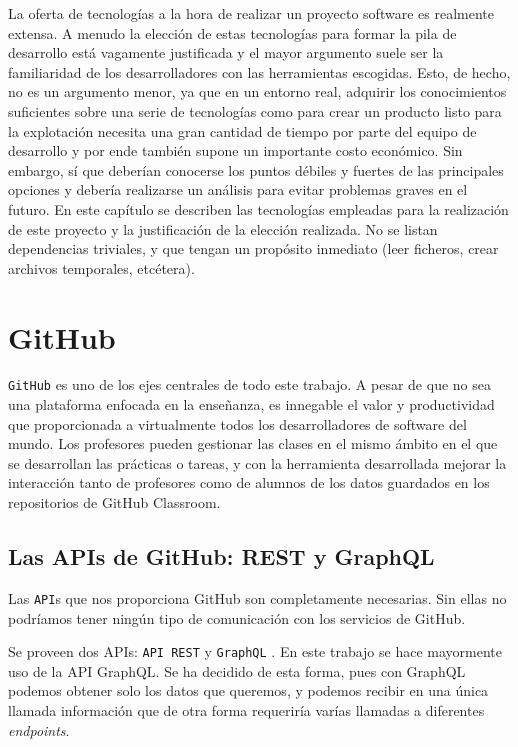 La oferta de tecnologías a la hora de realizar un proyecto software es realmente extensa. A menudo la elección de estas tecnologías para formar la pila de desarrollo está vagamente justificada y el mayor argumento suele ser la familiaridad de los desarrolladores con las herramientas escogidas. Esto, de hecho, no es un argumento menor, ya que en un entorno real, adquirir los conocimientos suficientes sobre una serie de tecnologías como para crear un producto listo para la explotación necesita una gran cantidad de tiempo por parte del equipo de desarrollo y por ende también supone un importante costo económico. Sin embargo, sí que deberían conocerse los puntos débiles y fuertes de las principales opciones y debería realizarse un análisis para evitar problemas graves en el futuro. En este capítulo se describen las tecnologías empleadas para la realización de este proyecto y la justificación de la elección realizada. No se listan dependencias triviales, y que tengan un propósito inmediato (leer ficheros, crear archivos temporales, etcétera).


\section{GitHub}
\verb|GitHub| \cite{github} es uno de los ejes centrales de todo este trabajo. A pesar de que no sea una plataforma enfocada en la enseñanza, es innegable el valor y productividad que proporcionada a virtualmente todos los desarrolladores de software del mundo. Los profesores pueden gestionar las clases en el mismo ámbito en el que se desarrollan las prácticas o tareas, y con la herramienta desarrollada mejorar la interacción tanto de profesores como de alumnos de los datos guardados en los repositorios de GitHub Classroom.

\subsection{Las APIs de GitHub: REST y  GraphQL}
Las \verb|API|s que nos proporciona GitHub son completamente necesarias. Sin ellas no podríamos tener ningún tipo de comunicación con los servicios de GitHub.

Se proveen dos APIs: \verb|API REST| \cite{github-rest} y \verb|GraphQL| \cite{github-graphql}. En este trabajo se hace mayormente uso de la API GraphQL. Se ha decidido de esta forma, pues con GraphQL podemos obtener solo los datos que queremos, y podemos recibir en una única llamada información que de otra forma requeriría varías llamadas a diferentes \emph{endpoints}.

